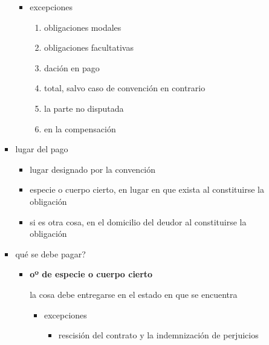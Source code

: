 \documentclass[]{article}
\providecommand{\tightlist}{%
  \setlength{\itemsep}{0pt}\setlength{\parskip}{0pt}}
\begin{document}
\begin{itemize}
\begin{itemize}
\begin{itemize}
      \begin{itemize}
      \tightlist
      \item
        excepciones

        \begin{enumerate}
        \def\labelenumi{\arabic{enumi}.}
        \tightlist
        \item
          obligaciones modales
        \item
          obligaciones facultativas
        \item
          dación en pago
        \item
          total, salvo caso de convención en contrario
        \item
          la parte no disputada
        \item
          en la compensación
        \end{enumerate}
      \end{itemize}
    \item
      lugar del pago

      \begin{itemize}
      \tightlist
      \item
        lugar designado por la convención
      \item
        especie o cuerpo cierto, en lugar en que exista al constituirse
        la obligación
      \item
        si es otra cosa, en el domicilio del deudor al constituirse la
        obligación
      \end{itemize}
    \item
      qué se debe pagar?

      \begin{itemize}
      \item
        \textbf{oº de especie o cuerpo cierto}

        la cosa debe entregarse en el estado en que se encuentra

        \begin{itemize}
        \tightlist
        \item
          excepciones

          \begin{itemize}
          \tightlist
          \item
            rescisión del contrato y la indemnización de perjuicios


\end{itemize}
\end{itemize}
\end{itemize}
\end{itemize}
\end{itemize}
\end{itemize}
\end{document}
